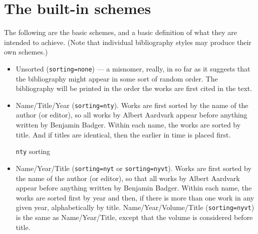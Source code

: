 \section{The built-in schemes}

The following are the basic schemes, and a basic definition of what they
are intended to achieve. (Note that individual bibliography styles may
produce their own schemes.)

\begin{itemize}
\item
  Unsorted (\texttt{sorting=none}) --- a misnomer, really, in so far as
  it suggests that the bibliography might appear in some sort of random
  order. The bibliography will be printed in the order the works are
  first cited in the text.
\item
  Name/Title/Year (\texttt{sorting=nty}). Works are first sorted by the
  name of the author (or editor), so all works by Albert Aardvark appear
  before anything written by Benjamin Badger. Within each name, the
  works are sorted by title. And if titles are identical, then the
  earlier in time is placed first.
  \begin{marginfigure}[-20ex]
  \vspace{0.5pt}
  \caption{\texttt{nty} sorting}
  \end{marginfigure}
\item
  Name/Year/Title (\texttt{sorting=nyt} or \texttt{sorting=nyvt}). Works are first sorted by the
  name of the author (or editor), so that all works by Albert Aardvark
  appear before anything written by Benjamin Badger. Within each name,
  the works are sorted first by year and then, if there is more than one
  work in any given year, alphabetically by title. Name/Year/Volume/Title (\texttt{sorting=nyvt}) is the same as
  Name/Year/Title, except that the volume is considered before title.

\end{itemize}
